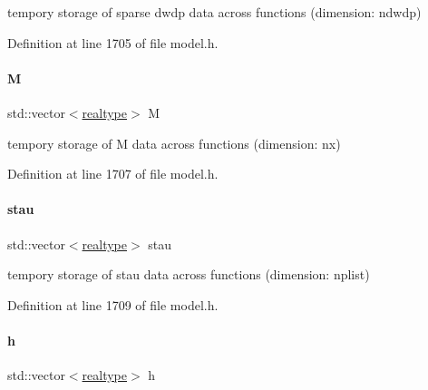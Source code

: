 tempory storage of sparse dwdp data across functions (dimension\+: ndwdp) 

Definition at line 1705 of file model.\+h.

\mbox{\label{classamici_1_1_model_a0a114d4a6ddc9469fe5e5b4a31317d89}} 
\paragraph{\texorpdfstring{M}{M}}
{\footnotesize\ttfamily std\+::vector$<$\mbox{\hyperlink{namespaceamici_a1bdce28051d6a53868f7ccbf5f2c14a3}{realtype}}$>$ M\hspace{0.3cm}{\ttfamily [protected]}}

tempory storage of M data across functions (dimension\+: nx) 

Definition at line 1707 of file model.\+h.

\mbox{\label{classamici_1_1_model_a989f1b7cc176a86d9684f4ccecb16b0d}} 
\paragraph{\texorpdfstring{stau}{stau}}
{\footnotesize\ttfamily std\+::vector$<$\mbox{\hyperlink{namespaceamici_a1bdce28051d6a53868f7ccbf5f2c14a3}{realtype}}$>$ stau\hspace{0.3cm}{\ttfamily [protected]}}

tempory storage of stau data across functions (dimension\+: nplist) 

Definition at line 1709 of file model.\+h.

\mbox{\label{classamici_1_1_model_a0e4df9c10406b35bd54f6f839322ca87}} 
\paragraph{\texorpdfstring{h}{h}}
{\footnotesize\ttfamily std\+::vector$<$\mbox{\hyperlink{namespaceamici_a1bdce28051d6a53868f7ccbf5f2c14a3}{realtype}}$>$ h\hspace{0.3cm}{\ttfamily [protected]}}

